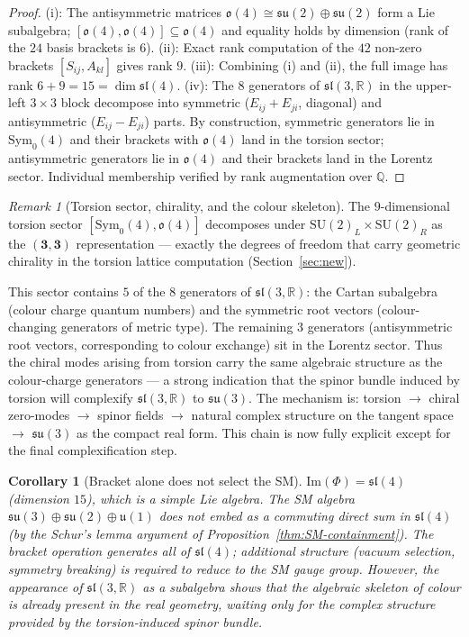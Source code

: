 \documentclass[12pt,a4paper]{article}
\theoremstyle{plain}
\newtheorem{corollary}[theorem]{Corollary}
\theoremstyle{definition}
\theoremstyle{remark}
\newtheorem{remark}[theorem]{Remark}
\begin{document}
\begin{proof}
(i): The antisymmetric matrices $\mathfrak{o}(4) \cong \mathfrak{su}(2)\oplus\mathfrak{su}(2)$ form a Lie subalgebra;
$[\mathfrak{o}(4),\mathfrak{o}(4)]\subseteq\mathfrak{o}(4)$ and equality holds by dimension (rank of the $24$ basis brackets is $6$).
(ii): Exact rank computation of the $42$ non-zero brackets $[S_{ij},A_{kl}]$ gives rank $9$.
(iii): Combining (i) and (ii), the full image has rank $6+9=15 = \dim\mathfrak{sl}(4)$.
(iv): The $8$ generators of $\mathfrak{sl}(3,\mathbb{R})$ in the upper-left 
$3\times 3$ block decompose into symmetric ($E_{ij}+E_{ji}$, diagonal) and 
antisymmetric ($E_{ij}-E_{ji}$) parts.  By construction, symmetric generators 
lie in $\mathrm{Sym}_0(4)$ and their brackets with $\mathfrak{o}(4)$ land in 
the torsion sector; antisymmetric generators lie in $\mathfrak{o}(4)$ and their 
brackets land in the Lorentz sector.  Individual membership verified by rank 
augmentation over $\mathbb{Q}$.
\end{proof}

\begin{remark}[Torsion sector, chirality, and the colour skeleton]
The $9$-dimensional torsion sector $[\mathrm{Sym}_0(4),\mathfrak{o}(4)]$ decomposes under $\mathrm{SU}(2)_L\times\mathrm{SU}(2)_R$
as the $(\mathbf{3},\mathbf{3})$ representation --- exactly the degrees of freedom that carry geometric chirality
in the torsion lattice computation (Section~\ref{sec:new}).

This sector contains $5$ of the $8$ generators of $\mathfrak{sl}(3,\mathbb{R})$:
the Cartan subalgebra (colour charge quantum numbers) and the symmetric root
vectors (colour-changing generators of metric type).  The remaining $3$ generators
(antisymmetric root vectors, corresponding to colour exchange) sit in the Lorentz
sector.  Thus the chiral modes arising from torsion carry the same algebraic
structure as the colour-charge generators --- a strong indication that the spinor
bundle induced by torsion will complexify $\mathfrak{sl}(3,\mathbb{R})$ to
$\mathfrak{su}(3)$.  The mechanism is:
torsion $\to$ chiral zero-modes $\to$ spinor fields $\to$ natural complex
structure on the tangent space $\to$ $\mathfrak{su}(3)$ as the compact real form.
This chain is now fully explicit except for the final complexification step.
\end{remark}

\begin{corollary}[Bracket alone does not select the SM]
$\mathrm{Im}(\Phi) = \mathfrak{sl}(4)$ (dimension $15$), which is a simple Lie algebra.
The SM algebra $\mathfrak{su}(3) \oplus \mathfrak{su}(2) \oplus \mathfrak{u}(1)$
does not embed as a commuting direct sum in $\mathfrak{sl}(4)$ 
(by the Schur's lemma argument of Proposition~\ref{thm:SM-containment}).
The bracket operation generates \emph{all} of $\mathfrak{sl}(4)$;
additional structure (vacuum selection, symmetry breaking) is required 
to reduce to the SM gauge group.  However, the appearance of $\mathfrak{sl}(3,\mathbb{R})$
as a subalgebra shows that the algebraic skeleton of colour is already present in the
real geometry, waiting only for the complex structure provided by the torsion‑induced
spinor bundle.
\end{corollary}
\end{document}
